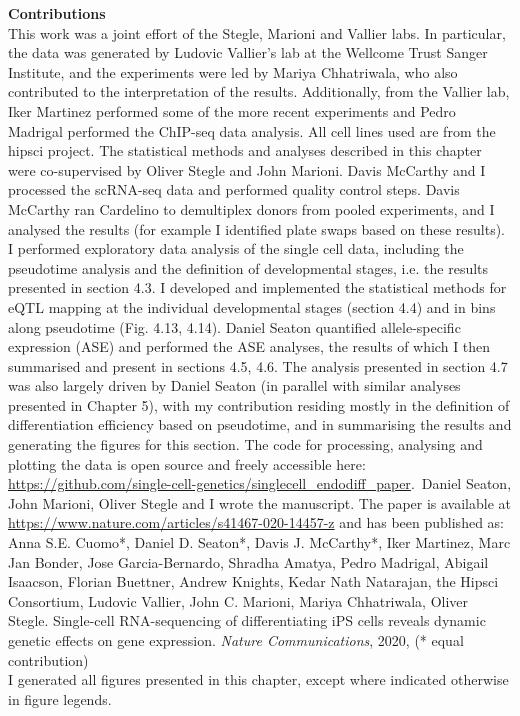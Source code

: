 \begin{Comment2}\label{contr:chapter4}
\hspace{-3mm}\textbf{Contributions} \\
This work was a joint effort of the Stegle, Marioni and Vallier labs. 
In particular, the data was generated by Ludovic Vallier’s lab at the Wellcome Trust Sanger Institute, and the experiments were led by Mariya Chhatriwala, who also contributed to the interpretation of the results. 
Additionally, from the Vallier lab, Iker Martinez performed some of the more recent experiments and Pedro Madrigal performed the ChIP-seq data analysis.
All cell lines used are from the \gls{hipsci} project. 
The statistical methods and analyses described in this chapter were co-supervised by Oliver Stegle and John Marioni. 
Davis McCarthy and I processed the scRNA-seq data and performed quality control steps.
Davis McCarthy ran Cardelino to demultiplex donors from pooled experiments, and I analysed the results (for example I identified plate swaps based on these results).
I performed exploratory data analysis of the single cell data, including the pseudotime analysis and the definition of developmental stages, i.e. the results presented in section 4.3.
I developed and implemented the statistical methods for eQTL mapping at the individual developmental stages (section 4.4) and in bins along pseudotime (Fig. 4.13, 4.14).
Daniel Seaton quantified allele-specific expression (ASE) and performed the ASE analyses, the results of which I then summarised and present in sections 4.5, 4.6.
The analysis presented in section 4.7 was also largely driven by Daniel Seaton (in parallel with similar analyses presented in Chapter 5), with my contribution residing mostly in the definition of differentiation efficiency based on pseudotime, and in summarising the results and generating the figures for this section.
The code for processing, analysing and plotting the data is open source and freely accessible here: \url{https://github.com/single-cell-genetics/singlecell\_endodiff\_paper}.\
Daniel Seaton, John Marioni, Oliver Stegle and I wrote the manuscript. 
The paper \cite{cuomo2020single} is available at \url{https://www.nature.com/articles/s41467-020-14457-z} and has been published as:\\

Anna S.E. Cuomo*, Daniel D. Seaton*, Davis J. McCarthy*, Iker Martinez, Marc Jan Bonder, Jose Garcia-Bernardo, Shradha Amatya, Pedro Madrigal, Abigail Isaacson, Florian Buettner, Andrew Knights, Kedar Nath Natarajan, the Hipsci Consortium, Ludovic Vallier, John C. Marioni, Mariya Chhatriwala, Oliver Stegle. Single-cell RNA-sequencing of differentiating iPS cells reveals dynamic genetic effects on gene expression. \textit{Nature Communications}, 2020, (* equal contribution) \\

I generated all figures presented in this chapter, except where indicated otherwise in figure legends. 

\end{Comment2}

